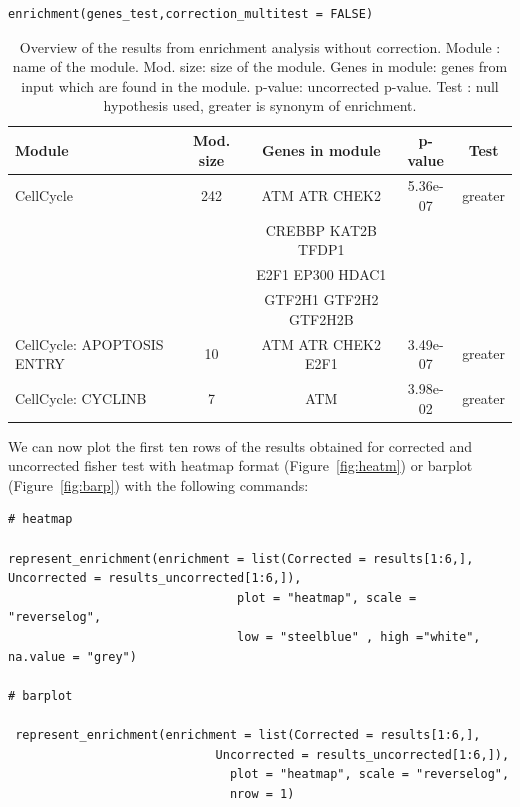 \documentclass[article]{jss}
\begin{document}
\begin{verbatim}
enrichment(genes_test,correction_multitest = FALSE)
\end{verbatim}


\begin{table}[h!]
  \centering
  \caption{Overview of the results from enrichment analysis without correction.
  Module : name of the module. Mod. size: size of the module. Genes in module:
  genes from input which are found in the module. p-value: uncorrected p-value.
  Test : null hypothesis used, greater is synonym of enrichment.}
  \label{tab:table2}

  \begin{tabular}{l|c|c|c|c}
	\hline
Module & Mod. size & Genes in module & p-value & Test\\
	\hline
CellCycle & 242 & ATM ATR CHEK2   & 5.36e-07 & greater \\
          &   &  CREBBP KAT2B TFDP1   &          &         \\
          &   &  E2F1 EP300 HDAC1    &          &         \\
          &	  & GTF2H1 GTF2H2 GTF2H2B &	& \\
CellCycle: APOPTOSIS ENTRY & 10 & ATM ATR CHEK2 E2F1 & 3.49e-07 & greater \\
CellCycle: CYCLINB			& 7  & ATM 				  & 3.98e-02 & greater \\



	\hline

	\end{tabular}
\end{table}

We can now plot the first ten rows of the results obtained for corrected and
uncorrected fisher test with heatmap format (Figure~\ref{fig:heatm}) or barplot
(Figure~\ref{fig:barp}) with the following commands:

\begin{verbatim}
# heatmap

represent_enrichment(enrichment = list(Corrected = results[1:6,], 
Uncorrected = results_uncorrected[1:6,]),
                                plot = "heatmap", scale = "reverselog", 
                                low = "steelblue" , high ="white", na.value = "grey")

# barplot 

 represent_enrichment(enrichment = list(Corrected = results[1:6,], 
                             Uncorrected = results_uncorrected[1:6,]),
                               plot = "heatmap", scale = "reverselog", 
                               nrow = 1)
\end{verbatim}
\end{document}
